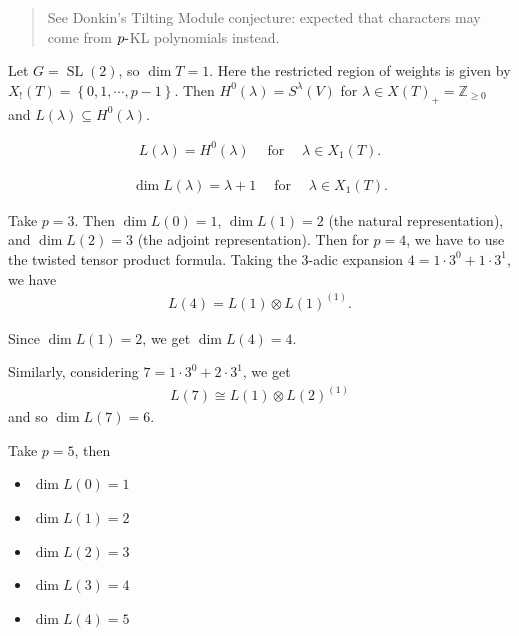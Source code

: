 \begin{quote}
See Donkin's Tilting Module conjecture: expected that characters may
come from \(p{\hbox{-}}\)KL polynomials instead.
\end{quote}

\begin{example}

Let \(G= {\operatorname{SL}}(2)\), so \(\dim T =1\). Here the restricted
region of weights is given by
\(X_!(T) = \left\{{0,1,\cdots, p-1}\right\}\). Then
\(H^0(\lambda) = S^\lambda(V)\) for
\(\lambda \in X(T)_+ = {\mathbb{Z}}_{\geq 0}\) and
\(L(\lambda) \subseteq H^0(\lambda)\).

\begin{theorem}[?]

\begin{align*}  
L(\lambda) =  H^0(\lambda) {\quad \operatorname{for} \quad} \lambda \in X_1(T)
.\end{align*}

\end{theorem}

\begin{theorem}[?]

\begin{align*}  
\dim L(\lambda) = \lambda + 1 {\quad \operatorname{for} \quad} \lambda \in X_1(T)
.\end{align*}

\end{theorem}

Take \(p=3\). Then \(\dim L(0) = 1\), \(\dim L(1) = 2\) (the natural
representation), and \(\dim L(2) = 3\) (the adjoint representation).
Then for \(p=4\), we have to use the twisted tensor product formula.
Taking the 3-adic expansion \(4 = 1\cdot 3^0 + 1\cdot 3^1\), we have
\begin{align*}  
L(4) = L(1) \otimes L(1)^{(1)}
.\end{align*}

Since \(\dim L(1) = 2\), we get \(\dim L(4) = 4\).

Similarly, considering \(7 = 1\cdot 3^0 + 2\cdot 3^1\), we get
\begin{align*}  
L(7) \cong L(1) \otimes L(2)^{(1)}
\end{align*}
and so \(\dim L(7) = 6\).

Take \(p=5\), then

\begin{itemize}
\tightlist
\item
  \(\dim L(0) = 1\)
\item
  \(\dim L(1) = 2\)
\item
  \(\dim L(2) = 3\)
\item
  \(\dim L(3) = 4\)
\item
  \(\dim L(4) = 5\)
\end{itemize}


\end{example}
